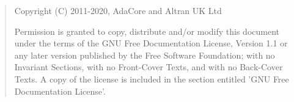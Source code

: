 \bigskip
\begin{quote}
   Copyright (C) 2011-2020, AdaCore and Altran UK Ltd

   Permission is granted to copy, distribute and/or modify this document
   under the terms of the GNU Free Documentation License, Version 1.1
   or any later version published by the Free Software Foundation;
   with no Invariant Sections, with no Front-Cover Texts, and with no
   Back-Cover Texts.
   A copy of the license is included in the section entitled 'GNU
   Free Documentation License'.
\end{quote}
\bigskip
